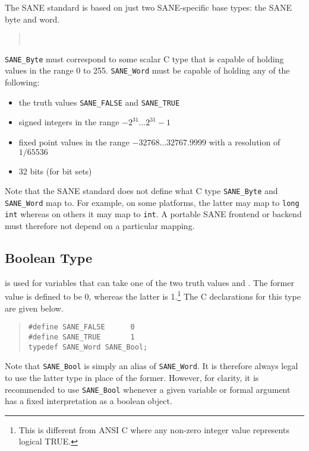 \documentclass[11pt,DVIps]{report}
\begin{document}
The SANE standard is based on just two SANE-specific base types: the
SANE byte and word.
\begin{quote}
   \\
\end{quote}
\verb|SANE_Byte| must correspond to some scalar C type that is capable
of holding values in the range 0 to 255.  \verb|SANE_Word| must be
capable of holding any of the following:
\begin{itemize}
  \item the truth values \verb|SANE_FALSE| and \verb|SANE_TRUE|
  \item signed integers in the range $-2^{31}\ldots2^{31}-1$
  \item fixed point values in the range $-32768\ldots32767.9999$ with
    a resolution of $1/65536$
  \item 32 bits (for bit sets)
\end{itemize}
Note that the SANE standard does not define what C type
\verb|SANE_Byte| and \verb|SANE_Word| map to.  For example, on some
platforms, the latter may map to \verb|long int| whereas on others it
may map to \verb|int|.  A portable SANE frontend or backend must
therefore not depend on a particular mapping.

\subsection{Boolean Type}

 is used for variables that can take one of
the two truth values  and
.  The former value is defined to be 0,
whereas the latter is 1.\footnote{This is different from ANSI C where
  any non-zero integer value represents logical TRUE.} The C
declarations for this type are given below.
\begin{quote}
\begin{verbatim}
#define SANE_FALSE      0
#define SANE_TRUE       1
typedef SANE_Word SANE_Bool;
\end{verbatim}
\end{quote}
Note that \verb|SANE_Bool| is simply an alias of \verb|SANE_Word|.  It
is therefore always legal to use the latter type in place of the
former.  However, for clarity, it is recommended to use
\verb|SANE_Bool| whenever a given variable or formal argument has a
fixed interpretation as a boolean object.
\end{document}
